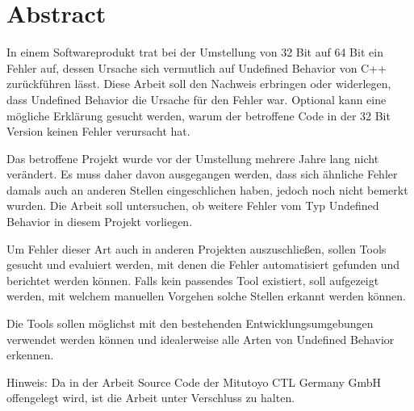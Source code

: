 \chapter*{Abstract}
\label{ch:abstract}
In einem Softwareprodukt trat bei der Umstellung von 32 Bit auf 64 Bit ein Fehler auf,
dessen Ursache sich vermutlich auf Undefined Behavior von C++ zurückführen lässt. Diese Arbeit soll den Nachweis erbringen oder widerlegen,
dass Undefined Behavior die Ursache für den Fehler war. Optional kann eine mögliche Erklärung gesucht werden,
warum der betroffene Code in der 32 Bit Version keinen Fehler verursacht hat.

Das betroffene Projekt wurde vor der Umstellung mehrere Jahre lang nicht verändert. Es muss daher davon ausgegangen werden,
dass sich ähnliche Fehler damals auch an anderen Stellen eingeschlichen haben, jedoch noch nicht  bemerkt wurden.
Die Arbeit soll untersuchen, ob weitere Fehler vom Typ Undefined Behavior in diesem Projekt vorliegen.

Um Fehler dieser Art auch in anderen Projekten auszuschließen, sollen Tools gesucht und evaluiert werden,
mit denen die Fehler automatisiert gefunden und berichtet werden können. Falls kein passendes Tool existiert, soll aufgezeigt werden,
mit welchem manuellen Vorgehen solche Stellen erkannt werden können.

Die Tools sollen möglichst mit den bestehenden Entwicklungsumgebungen verwendet werden können und idealerweise alle Arten von
Undefined Behavior erkennen.

Hinweis: Da in der Arbeit Source Code der Mitutoyo CTL Germany GmbH offengelegt wird, ist die Arbeit unter Verschluss zu halten.
